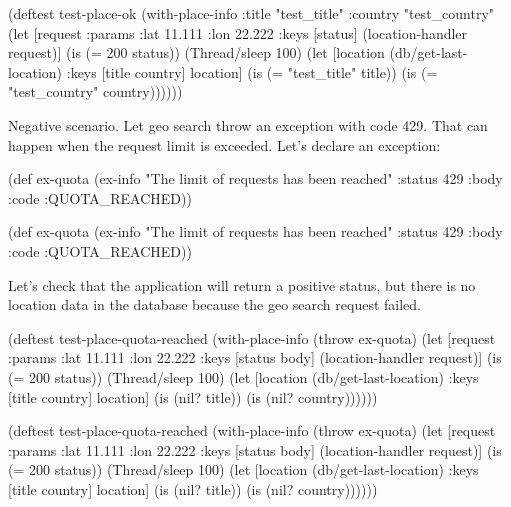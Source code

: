 \else

\begin{clojure}
(deftest test-place-ok
  (with-place-info
    {:title "test_title"
     :country "test_country"}
    (let [request {:params {:lat 11.111 :lon 22.222}}
          {:keys [status]} (location-handler request)]
      (is (= 200 status))
      (Thread/sleep 100)
      (let [location (db/get-last-location)
            {:keys [title country]} location]
        (is (= "test_title" title))
        (is (= "test_country" country))))))
\end{clojure}

\fi


Negative scenario. Let geo search throw an exception with code 429.
That can happen when the request limit is exceeded. Let's declare an exception:

\ifx\DEVICETYPE\MOBILE

\begin{clojure}
(def ex-quota
  (ex-info
    "The limit of requests
               has been reached"
    {:status 429
     :body {:code :QUOTA_REACHED}}))
\end{clojure}

\else

\begin{clojure}
(def ex-quota
  (ex-info "The limit of requests has been reached"
           {:status 429 :body {:code :QUOTA_REACHED}}))
\end{clojure}

\fi

\noindent
Let's check that the application will return a positive status, but there is no location data in the database because the geo search request failed.

\ifx\DEVICETYPE\MOBILE

\begin{clojure}
(deftest test-place-quota-reached
  (with-place-info (throw ex-quota)
  (let [request {:params {:lat 11.111
                          :lon 22.222}}
        {:keys [status body]}
        (location-handler request)]
      (is (= 200 status))
      (Thread/sleep 100)
      (let [location
            (db/get-last-location)
            {:keys [title country]}
            location]
        (is (nil? title))
        (is (nil? country))))))
\end{clojure}

\else

\begin{clojure}
(deftest test-place-quota-reached
  (with-place-info (throw ex-quota)
    (let [request {:params {:lat 11.111 :lon 22.222}}
          {:keys [status body]} (location-handler request)]
      (is (= 200 status))
      (Thread/sleep 100)
      (let [location (db/get-last-location)
            {:keys [title country]} location]
        (is (nil? title))
        (is (nil? country))))))
\end{clojure}

